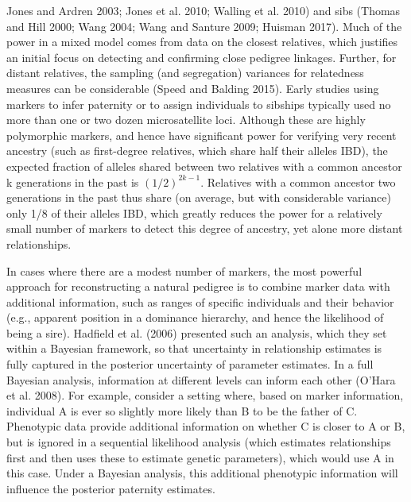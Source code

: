 \documentclass{article}
\begin{document}
Jones and Ardren 2003; Jones et al. 2010; Walling et al. 2010) and sibs (Thomas and Hill 2000; Wang 2004; Wang and Santure 2009; Huisman 2017). Much of the power in a mixed model comes from data on the closest relatives, which justifies an initial focus on detecting and confirming close pedigree linkages. Further, for distant relatives, the sampling (and segregation) variances for relatedness measures can be considerable (Speed and Balding 2015). Early studies using markers to infer paternity or to assign individuals to sibships typically used no more than one or two dozen microsatellite loci. Although these are highly polymorphic markers, and hence have significant power for verifying very recent ancestry (such as first-degree relatives, which share half their alleles IBD), the expected fraction of alleles shared between two relatives with a common ancestor k generations in the past is  $ (1/2)^{2k-1} $. Relatives with a common ancestor two generations in the past thus share (on average, but with considerable variance) only 1/8 of their alleles IBD, which greatly reduces the power for a relatively small number of markers to detect this degree of ancestry, yet alone more distant relationships.

In cases where there are a modest number of markers, the most powerful approach for reconstructing a natural pedigree is to combine marker data with additional information, such as ranges of specific individuals and their behavior (e.g., apparent position in a dominance hierarchy, and hence the likelihood of being a sire). Hadfield et al. (2006) presented such an analysis, which they set within a Bayesian framework, so that uncertainty in relationship estimates is fully captured in the posterior uncertainty of parameter estimates. In a full Bayesian analysis, information at different levels can inform each other (O'Hara et al. 2008). For example, consider a setting where, based on marker information, individual A is ever so slightly more likely than B to be the father of C. Phenotypic data provide additional information on whether C is closer to A or B, but is ignored in a sequential likelihood analysis (which estimates relationships first and then uses these to estimate genetic parameters), which would use A in this case. Under a Bayesian analysis, this additional phenotypic information will influence the posterior paternity estimates.
\end{document}
